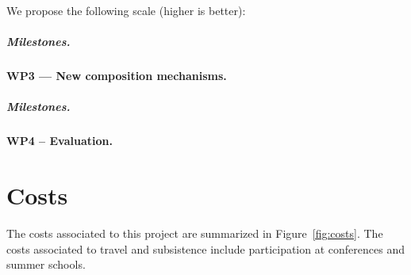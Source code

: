 \documentclass[10pt]{article}
\begin{document}
We propose the following scale (higher is better):

\subparagraph{Milestones.}

\paragraph{WP3 --- New composition mechanisms.}


\vspace{-\baselineskip}
\subparagraph{Milestones.}

\paragraph{WP4 -- Evaluation.}















\section{Costs}
The costs associated to this project are summarized in Figure~\ref{fig:costs}.  
The costs associated to travel and subsistence include participation at conferences and summer schools. 
\end{document}
